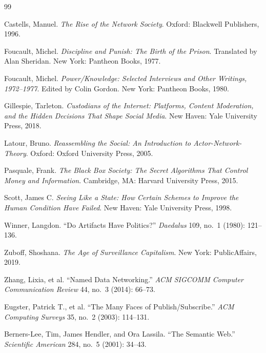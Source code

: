 \documentclass[11pt,a4paper]{article}
\begin{document}
\begin{thebibliography}{99}

Castells, Manuel.
\textit{The Rise of the Network Society}.
Oxford: Blackwell Publishers, 1996.

Foucault, Michel.
\textit{Discipline and Punish: The Birth of the Prison}.
Translated by Alan Sheridan.
New York: Pantheon Books, 1977.

Foucault, Michel.
\textit{Power/Knowledge: Selected Interviews and Other Writings, 1972--1977}.
Edited by Colin Gordon.
New York: Pantheon Books, 1980.

Gillespie, Tarleton.
\textit{Custodians of the Internet: Platforms, Content Moderation, and the Hidden Decisions That Shape Social Media}.
New Haven: Yale University Press, 2018.

Latour, Bruno.
\textit{Reassembling the Social: An Introduction to Actor-Network-Theory}.
Oxford: Oxford University Press, 2005.

Pasquale, Frank.
\textit{The Black Box Society: The Secret Algorithms That Control Money and Information}.
Cambridge, MA: Harvard University Press, 2015.

Scott, James C.
\textit{Seeing Like a State: How Certain Schemes to Improve the Human Condition Have Failed}.
New Haven: Yale University Press, 1998.

Winner, Langdon.
``Do Artifacts Have Politics?''
\textit{Daedalus} 109, no.\ 1 (1980): 121--136.

Zuboff, Shoshana.
\textit{The Age of Surveillance Capitalism}.
New York: PublicAffairs, 2019.


Zhang, Lixia, et al.
``Named Data Networking.''
\textit{ACM SIGCOMM Computer Communication Review} 44, no.\ 3 (2014): 66--73.

Eugster, Patrick T., et al.
``The Many Faces of Publish/Subscribe.''
\textit{ACM Computing Surveys} 35, no.\ 2 (2003): 114--131.

Berners-Lee, Tim, James Hendler, and Ora Lassila.
``The Semantic Web.''
\textit{Scientific American} 284, no.\ 5 (2001): 34--43.


\end{thebibliography}
\end{document}
